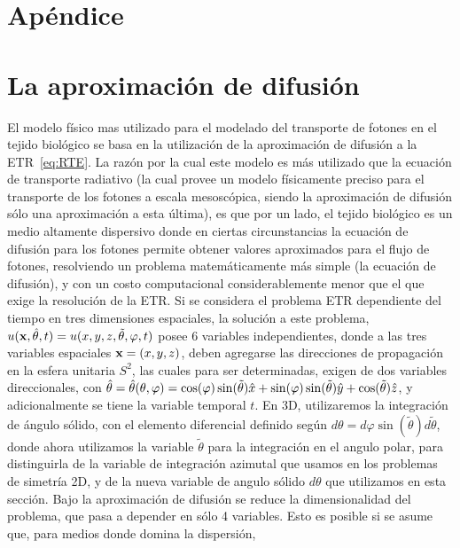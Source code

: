 \chapter*{Apéndice}
\lhead{\thepage}
\vspace{0.01\textheight}
\chapter{La aproximación de difusión}
\label{ap:ecdiff}

El modelo físico mas utilizado para el modelado del transporte de fotones en el 
tejido biológico se basa en la utilización de la aproximación de 
difusión a la ETR~\eqref{eq:RTE}. La razón por la cual este modelo es más utilizado 
que la ecuación de transporte radiativo (la cual 
provee un modelo físicamente preciso para el transporte de los fotones a escala mesoscópica, 
siendo la aproximación de difusión sólo una aproximación a esta última), es que 
por un lado, el tejido biológico es un medio 
altamente dispersivo donde en ciertas circunstancias la ecuación de difusión para los fotones permite obtener valores aproximados para el flujo de fotones, resolviendo un problema matemáticamente 
más simple (la ecuación de difusión), y con un costo computacional 
considerablemente menor que el que exige la resolución de la ETR. 
Si se considera el problema ETR dependiente del tiempo 
en tres dimensiones espaciales, la solución a este problema, $u(\mathbf{x},\hat{\theta},t)=u(x,y,z,\tilde{\theta},\varphi,t)$  
posee 6 variables independientes, donde a las tres variables espaciales $\mathbf{x}=(x,y,z)$, 
deben agregarse las direcciones de propagación en la esfera unitaria $S^2$, las 
cuales para ser determinadas, exigen de dos variables direccionales, con $\hat{\theta}=\hat{\theta}(\theta,\varphi)=\cos(\varphi)\sin(\tilde{\theta})\hat x+\sin(\varphi)\sin(\tilde{\theta})\hat y+\cos(\tilde{\theta}) \hat z$, y adicionalmente se tiene la variable temporal $t$. En 3D, utilizaremos 
la integración de ángulo sólido, con el elemento diferencial definido según 
$d\theta= d\varphi \sin(\tilde{\theta}) d\tilde{\theta}$, 
donde ahora utilizamos la variable $\tilde{\theta}$ para la integración en el angulo polar, 
para distinguirla de la variable de integración azimutal que usamos en los problemas de simetría 2D, y de la nueva variable de angulo sólido $d\theta$ que utilizamos en esta sección. Bajo la aproximación 
de difusión se reduce la dimensionalidad del problema, que pasa a depender en sólo 4 variables. 
Esto es posible si se asume que, para medios donde domina la dispersión, 
